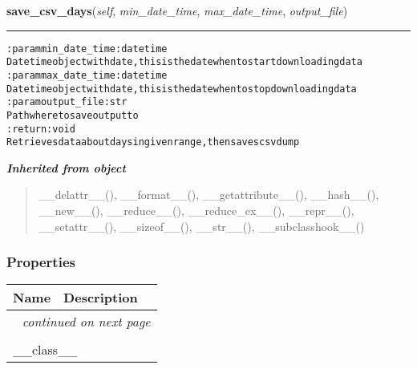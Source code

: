     \label{pygce:models:bot:GarminConnectBot:save_csv_days}

    \vspace{0.5ex}

\hspace{.8\funcindent}\begin{boxedminipage}{\funcwidth}

    \raggedright \textbf{save\_csv\_days}(\textit{self}, \textit{min\_date\_time}, \textit{max\_date\_time}, \textit{output\_file})

    \vspace{-1.5ex}

    \rule{\textwidth}{0.5\fboxrule}
\setlength{\parskip}{2ex}
\begin{alltt}

:param min\_date\_time: datetime
    Datetime object with date, this is the date when to start downloading data
:param max\_date\_time: datetime
    Datetime object with date, this is the date when to stop downloading data
:param output\_file: str
    Path where to save output to
:return: void
    Retrieves data about days in given range, then saves csv dump
\end{alltt}

\setlength{\parskip}{1ex}
    \end{boxedminipage}


\large{\textbf{\textit{Inherited from object}}}

\begin{quote}
\_\_delattr\_\_(), \_\_format\_\_(), \_\_getattribute\_\_(), \_\_hash\_\_(), \_\_new\_\_(), \_\_reduce\_\_(), \_\_reduce\_ex\_\_(), \_\_repr\_\_(), \_\_setattr\_\_(), \_\_sizeof\_\_(), \_\_str\_\_(), \_\_subclasshook\_\_()
\end{quote}


  \subsubsection{Properties}

    \vspace{-1cm}
\hspace{\varindent}\begin{longtable}{|p{\varnamewidth}|p{\vardescrwidth}|l}
\cline{1-2}
\cline{1-2} \centering \textbf{Name} & \centering \textbf{Description}& \\
\cline{1-2}
\endhead\cline{1-2}\multicolumn{3}{r}{\small\textit{continued on next page}}\\\endfoot\cline{1-2}
\endlastfoot\multicolumn{2}{|l|}{\textit{Inherited from object}}\\
\multicolumn{2}{|p{\varwidth}|}{\raggedright \_\_class\_\_}\\
\cline{1-2}
\end{longtable}


